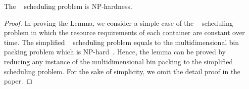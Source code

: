 \begin{lemma}
The \sol~ scheduling problem is NP-hardness.
\end{lemma}
\begin{proof}
In proving the Lemma, we consider a simple case of the \sol~ scheduling problem in which the resource
requirements of each container are constant over time. The simplified \sol~ scheduling problem equals to
the multidimensional bin packing problem which is NP-hard~\cite{Bansal:2006:IAA,Meyerson:2013:OMLB,Im:2015:TBO}.
Hence, the lemma can be proved by reducing any instance of the multidimensional bin packing to the simplified \sol~
scheduling problem. For the sake of simplicity, we omit the detail proof in the paper.
\end{proof}

\begin{comment}
\begin{table}[ht]
\caption{Notation Table}
 \centering
 \small
 \begin{tabular}{c l}
  \hline
  \hline
  $M_{id}$ / $W_{id}$ &  Manager ID / Worker ID \\
  \hline
  $S_{id}$ / $C_{id}$ & Service ID / Container ID \\
  \hline
  $W_j^{k}$ & The total $k$th resource on the $j$th worker node\\
  \hline
  $r_i^{k}(t)$ &  the $k$th resource requirement of \\
  & the $i$th container at time $t$\\
  \hline
  $\{KS\}$ & A set stores known services IDs \\
  \hline
  $DOM(S_{id})$ & A function records dominate resource attribute \\


  \hline
  \hline
\label{table:locations}
\end{tabular}
\end{table}

\end{comment}


